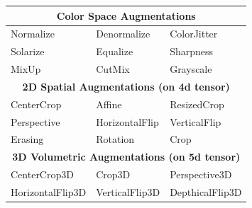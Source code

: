 \begin{figure}
  \begin{minipage}[b]{0.7\linewidth}
    \centering
        \begin{tabular}{lll}
        \toprule
        \multicolumn{3}{c}{\textbf{Color Space Augmentations}}\\
        \midrule
        Normalize& Denormalize & ColorJitter\\
        Solarize & Equalize & Sharpness \\
        MixUp &  CutMix  & Grayscale \\
        \midrule
        \multicolumn{3}{c}{\textbf{2D Spatial Augmentations (on 4d tensor)}}\\
        \midrule
        CenterCrop & Affine & ResizedCrop \\
        Perspective & HorizontalFlip & VerticalFlip \\
        Erasing & Rotation & Crop \\
        \midrule
        \multicolumn{3}{c}{\textbf{3D Volumetric Augmentations (on 5d tensor)}}\\
        \midrule
        CenterCrop3D & Crop3D & Perspective3D\\
        HorizontalFlip3D & VerticalFlip3D & DepthicalFlip3D \\
        \bottomrule
        \end{tabular}
    \par\vspace{0pt}
  \end{minipage}
  \begin{minipage}[b]{0.25\linewidth}
    \centering

\end{minipage}
\end{figure}
